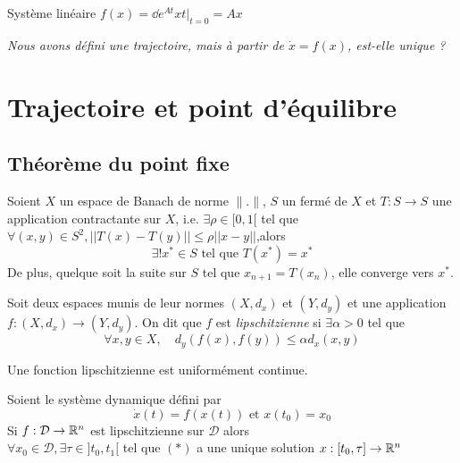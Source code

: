 \documentclass[main.tex]{subfiles}
\newcommand{\D}{\mathcal{D}}
\begin{document}
\begin{exemple}
Système linéaire $f(x)=\dd{e^{At}x}{t}|_{t=0}=Ax$
\end{exemple}
\emph{Nous avons défini une trajectoire, mais à partir de $\dot{x}=f(x)$, est-elle unique ?}

\section{Trajectoire et point d'équilibre}
\subsection{Théorème du point fixe}
\begin{thm}
Soient $X$ un espace de Banach de norme $\|.\|$, $S$ un fermé de $X$ et $T:S\rightarrow S$ une application contractante sur $X$, i.e. $\exists \rho \in [0,1[$ tel que $\forall (x,y) \in S^2, ||T(x)-T(y)|| \leq \rho ||x-y||$,alors
\[  \exists ! x^* \in S \text{ tel que } T(x^*)=x^*\]
De plus, quelque soit la suite sur $S$ tel que $x_{n+1}=T(x_n)$, elle converge vers $ x^* $.
\end{thm}

\begin{defin}
  Soit deux espaces munis de leur normes $(X,d_x)$ et $(Y,d_y)$ et une application $f:(X,d_x) \rightarrow (Y,d_y)$.
  On dit que  $f$ est \emph{lipschitzienne} si $\exists \alpha > 0$ tel que
  \[\forall x,y \in X, \quad d_y(f(x),f(y)) \leq \alpha d_x(x,y)\]
\end{defin}

\begin{rem}
Une fonction lipschitzienne est uniformément continue.
\end{rem}

\begin{thm}
Soient le système dynamique défini par
\[
\dot{x}(t)=f(x(t)) \text{ et } x(t_0)=x_0\tag{$\ast$}
\]
Si $f:\D \rightarrow \R^n$ est lipschitzienne sur $\D$ alors \\
$\forall x_0 \in \D, \exists \tau \in ]t_0,t_1[$ tel que $(\ast)$ a une unique solution $x:[t_0,\tau] \rightarrow \mathbb{R}^n$
\end{thm}
\end{document}
